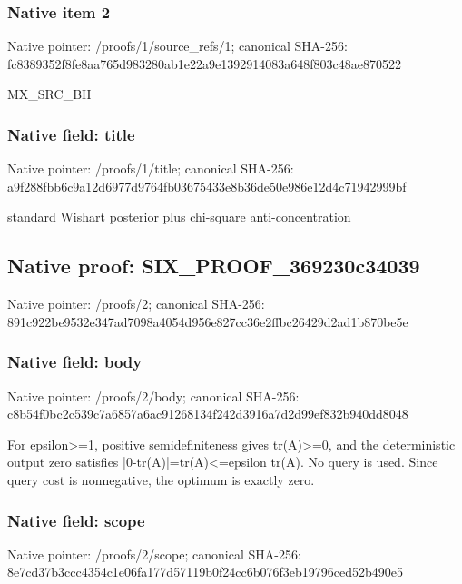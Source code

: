 \documentclass[10pt,a4paper]{article}
\begin{document}
\subsubsection{Native item 2}
Native pointer: /proofs/1/source\_\allowbreak{}refs/1; canonical SHA-256: fc8389352f8fe8aa765d983280ab1e22a9e1392914083a648f803c48ae870522

\begingroup\raggedright\sloppy MX\_\allowbreak{}SRC\_\allowbreak{}BH\par\endgroup

\subsubsection{Native field: title}
Native pointer: /proofs/1/title; canonical SHA-256: a9f288fbb6c9a12d6977d9764fb03675433e8b36de50e986e12d4c71942999bf

\begingroup\raggedright\sloppy standard Wishart posterior plus chi-square anti-concentration\par\endgroup

\subsection{Native proof: SIX\_\allowbreak{}PROOF\_\allowbreak{}369230c34039}
Native pointer: /proofs/2; canonical SHA-256: 891c922be9532e347ad7098a4054d956e827cc36e2ffbc26429d2ad1b870be5e

\subsubsection{Native field: body}
Native pointer: /proofs/2/body; canonical SHA-256: c8b54f0bc2c539c7a6857a6ac91268134f242d3916a7d2d99ef832b940dd8048

\begingroup\raggedright\sloppy For epsilon>=\allowbreak{}1,\allowbreak{} positive semidefiniteness gives tr(A)>=\allowbreak{}0,\allowbreak{} and the deterministic output zero satisfies |0-tr(A)|=\allowbreak{}tr(A)<=\allowbreak{}epsilon tr(A). No query is used. Since query cost is nonnegative,\allowbreak{} the optimum is exactly zero.\par\endgroup

\subsubsection{Native field: scope}
Native pointer: /proofs/2/scope; canonical SHA-256: 8e7cd37b3ccc4354c1e06fa177d57119b0f24cc6b076f3eb19796ced52b490e5
\end{document}
